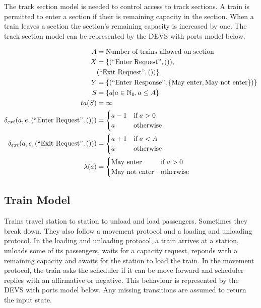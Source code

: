 The track section model is needed to control access to track sections. A train
is permitted to enter a section if their is remaining capacity in the section.
When a train leaves a section the section's remaining capacity is increased by
one. The track section model can be represented by the DEVS with ports model 
below.

\newcommand{\InEnterReq}[0]{(\text{``Enter Request''}, ())}
\newcommand{\InExitReq}[0]{(\text{``Exit Request''}, ())}

\newcommand{\OutEnterRes}[1]{(\text{``Enter Response''}, #1)}

\begin{align*}
    A &= \text{Number of trains allowed on section} \\
    X &= \{\InEnterReq, \\
        & \InExitReq
    \} \\
    Y &= \{\OutEnterRes{\{\text{May enter}, \text{May not enter}\}}\} \\
    S &= \{ a | a \in \mathbb{N}_0, a \leq A \} \\
    ta(S) &= \infty \\
    \delta_{ext}(a, e, \InEnterReq) &= 
        \begin{cases}
            a - 1 & \text{if\;} a > 0 \\
            a & \text{otherwise} \\
        \end{cases} \\
    \delta_{ext}(a, e, \InExitReq) &= 
        \begin{cases}
            a + 1 & \text{if\;} a < A \\
            a & \text{otherwise} \\
        \end{cases} \\
    \lambda(a) &= 
        \begin{cases}
            \text{May enter} & \text{if\;} a > 0 \\
            \text{May not enter} & \text{otherwise} \\
        \end{cases}
\end{align*}

\subsection{Train Model}

Trains travel station to station to unload and load passengers. Sometimes they
break down. They also follow a movement protocol and a loading and unloading
protocol. In the loading and unloading protocol, a train arrives at a station,
unloads some of its passengers, waits for a capacity request, reponds with a
remaining capacity and awaits for the station to load the train. In the movement
protocol, the train asks the scheduler if it can be move forward and scheduler
replies with an affirmative or negative. This behaviour is represented by the
DEVS with ports model below. Any missing transitions are assumed to return the
input state. 

